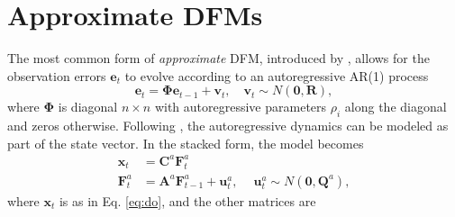 \documentclass[a4paper]{article}
\begin{document}
\section{Approximate DFMs}

The most common form of \emph{approximate} DFM, introduced by \citet{chamberlain2983arbitrage}, allows for the observation errors $\textbf{e}_t$ to evolve according to an autoregressive AR(1) process
\begin{equation} \label{eq:ar1}
\textbf{e}_t = \mathbf{\Phi} \textbf{e}_{t-1} + \textbf{v}_t,\quad \textbf{v}_t\sim N(\textbf{0}, \textbf{R}),
\end{equation}
where $\mathbf{\Phi}$ is diagonal $n\times n$ with autoregressive parameters $\rho_i$ along the diagonal and zeros otherwise. Following \citet{banbura2014maximum}, the autoregressive dynamics can be modeled as part of the state vector. 
In the stacked form, the model becomes 
\begin{align} \label{eq:doar1}
\textbf{x}_t &= \textbf{C}^a \textbf{F}_t^a \\
\textbf{F}_t^a &= \textbf{A}^a\textbf{F}^a_{t-1} + \textbf{u}_t^a, \quad\ \textbf{u}_t^a\sim  N(\textbf{0}, \textbf{Q}^a),
\end{align}
where $\textbf{x}_t$ is as in Eq. \ref{eq:do}, and the other matrices are
\end{document}

